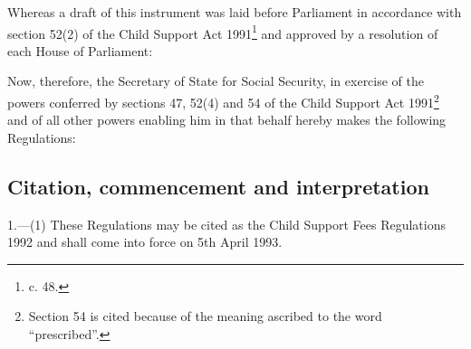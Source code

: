 \documentclass[12pt,a4paper]{article}
\title{\regstitle}
\author{S.I. 1992 No. 3094}
\date{Made 9th December 1992\\Coming into force 5th April 1993}
\begin{document}
\maketitle

\noindent
Whereas a draft of this instrument was laid before Parliament in accordance with section 52(2) of the Child Support Act 1991\footnote{ c. 48.} and approved by a resolution of each House of Parliament:

Now, therefore, the Secretary of State for Social Security, in exercise of the powers conferred by sections 47, 52(4) and 54 of the Child Support Act 1991\footnote{\frenchspacing Section 54 is cited because of the meaning ascribed to the word “prescribed”.} and of all other powers enabling him in that behalf hereby makes the following Regulations:

{\sloppy

\tableofcontents

}

\setcounter{secnumdepth}{-2}

\subsection[1. Citation, commencement and interpretation]{Citation, commencement and interpretation}

1.—(1) These Regulations may be cited as the Child Support Fees Regulations 1992 and shall come into force on 5th April 1993.
\end{document}
